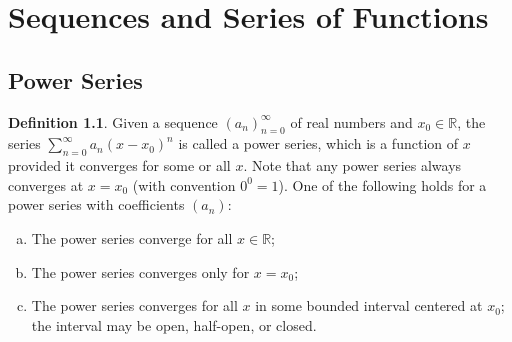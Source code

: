 \documentclass[12pt, lettersize]{book}
\theoremstyle{plain}
\theoremstyle{definition}
\newtheorem{dfn}[thm]{Definition}
\theoremstyle{remark}
\newcommand{\R}{\mathbb{R}}
\begin{document}
	\chapter{Sequences and Series of Functions}
		\newpage
		\section{Power Series}
			\begin{dfn}
			Given a sequence $(a_n)_{n=0}^{\infty}$ of real numbers and $x_0\in\R$, the series $\sum_{n=0}^{\infty}a_n(x-x_0)^n$ is called 
			a power series, which is a function of $x$ provided it converges for some or all $x$. Note  that any power series always converges at $x=x_0$ (with convention $0^0=1$). One of the following
			holds for a power series with coefficients $(a_n)$:
			\begin{enumerate}[(a)]
				\item The power series converge for all $x\in\R$;
				\item The power series converges only for $x=x_0$;
				\item The power series converges for all $x$ in some bounded interval centered at $x_0$; the interval may be
				open, half-open, or closed.
			\end{enumerate}
			\end{dfn}
			
\end{document}
